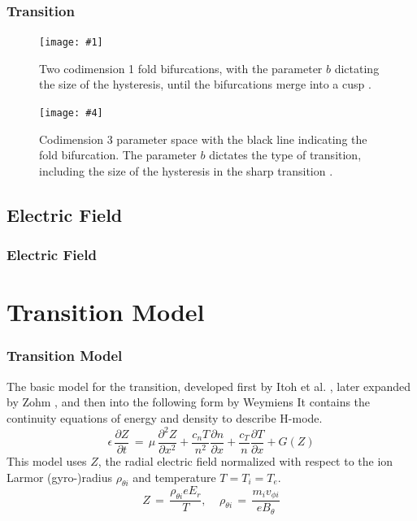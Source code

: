 \documentclass{beamer}
\newcommand\TwoFig[6]{%
	\sbox\IBoxA{\texttt{[image: \#1]}}
	\sbox\IBoxB{\texttt{[image: \#4]}}%
	\ifdim\ht\IBoxA>\ht\IBoxB
		\setlength\IHeight{\ht\IBoxB}%
	\else\setlength\IHeight{\ht\IBoxA}\fi
	\begin{figure}[ht]
		\minipage[t]{0.49\textwidth}\centering
			\texttt{[image: \#1]}
			\caption{#2}\label{#3}
		\endminipage\hfill
		\minipage[t]{0.49\textwidth}\centering
			\texttt{[image: \#4]}
			\caption{#5}\label{#6}
		\endminipage
	\end{figure}%
}
\begin{document}
\begin{frame}
\frametitle{Transition}
\TwoFig{../../Graphics/Bif_3D.png}
	{Two codimension 1 fold bifurcations, with the parameter $b$ dictating the size of the hysteresis, until the bifurcations merge into a cusp \cite{weymiens_bifurcation_2014}.}
	{fig:Bif_3D}
	{../../Graphics/3_transitions_single_simple.png}
	{Codimension 3 parameter space with the black line indicating the fold bifurcation. The parameter $b$ dictates the type of transition, including the size of the hysteresis in the sharp transition \cite{weymiens_bifurcation_2014}.}
	{fig:Bif_types}
\end{frame}


\subsection{Electric Field}
\begin{frame}
\frametitle{Electric Field}
\end{frame}



\section{Transition Model}
\begin{frame}
\frametitle{Transition Model}
	The basic model for the transition, developed first by Itoh et al. \cite{itoh_edge_1991}, later expanded by Zohm \cite{zohm_dynamic_1994},  and then into the following form by Weymiens \cite{weymiens_bifurcation_2014}
It contains the continuity equations of energy and density to describe H-mode.
\begin{equation}
	\epsilon\,\frac{\partial Z}{\partial t} \,=\, \mu\,\frac{\partial^2 Z}{\partial x^2} + \frac{c_n T}{n^2} \frac{\partial n}{\partial x} + \frac{c_T}{n} \frac{\partial T}{\partial x} + G(Z)
	\label{eq:pde}
\end{equation}
This model uses $Z$, the radial electric field normalized with respect to the ion Larmor (gyro-)radius $\rho_{\theta i}$ and temperature $T = T_i = T_e$.
\begin{equation}
	Z \,=\, \frac{\rho_{\theta i} e E_r}{T}, ~~~~~ \rho_{\theta i} \,=\, \frac{m_i v_{\phi i}}{e B_\theta}
	\label{eq:normalization}
\end{equation}
\end{frame}
\end{document}
